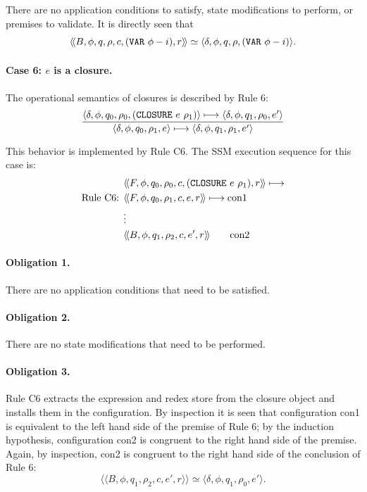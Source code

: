 
There are no application conditions to satisfy, state modifications to perform,
or premises to validate. It is directly seen that
\[
\langle\!\langle B,\phi,q,\rho,c,(\THOR{VAR}\ \phi-i),r\rangle\!\rangle
\simeq
\langle \delta,\phi,q,\rho,(\THOR{VAR}\ \phi-i)\rangle.
\]

\paragraph{Case 6: \(e\) is a closure.}
The operational semantics of closures is described by Rule 6:
\[
\frac{
  \langle \delta,\phi,q_0,\rho_0,(\texttt{CLOSURE}\ e\ \rho_1)\rangle
  \longmapsto
  \langle \delta,\phi,q_1,\rho_0,e'\rangle
}{
  \langle \delta,\phi,q_0,\rho_1,e\rangle
  \longmapsto
  \langle \delta,\phi,q_1,\rho_1,e'\rangle
}
\]

This behavior is implemented by Rule C6. The SSM execution sequence for this
case is:
\begin{align*}
&\langle\!\langle F,\phi,q_0,\rho_0,c,(\THOR{CLOSURE}\ e\ \rho_1),r\rangle\!\rangle
\longmapsto\\
\text{Rule C6: }&
\langle\!\langle F,\phi,q_0,\rho_1,c,e,r\rangle\!\rangle
\longmapsto \mathrm{con1}\\
&\vdots\\
&\langle\!\langle B,\phi,q_1,\rho_2,c,e',r\rangle\!\rangle
\qquad \mathrm{con2}
\end{align*}

\paragraph{Obligation 1.} There are no application conditions that need to be
satisfied.

\paragraph{Obligation 2.} There are no state modifications that need to be
performed.

\paragraph{Obligation 3.} Rule C6 extracts the expression and redex store from
the closure object and installs them in the configuration. By inspection it is
seen that configuration con1 is equivalent to the left hand side of the premise
of Rule 6; by the induction hypothesis, configuration con2 is congruent to the
right hand side of the premise. Again, by inspection, con2 is congruent to the
right hand side of the conclusion of Rule 6:
\[
\langle\!\langle B,\phi,q_1,\rho_2,c,e',r\rangle\!\rangle
\simeq
\langle \delta,\phi,q_1,\rho_0,e'\rangle.
\]

